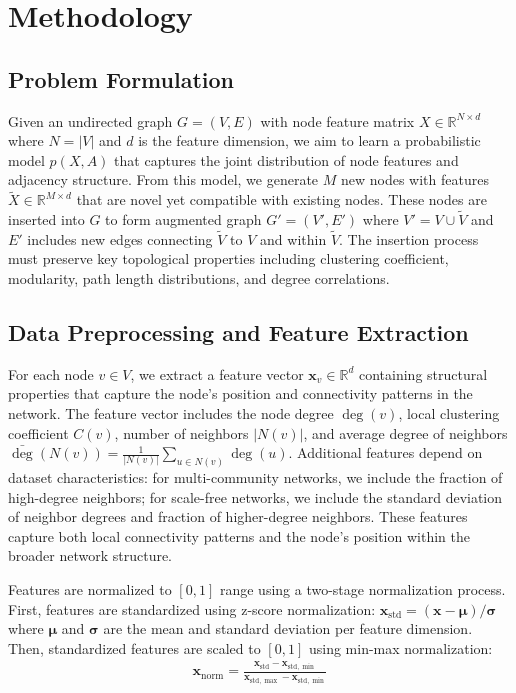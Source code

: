 \documentclass[12pt]{article}
\begin{document}
\section{Methodology}

\subsection{Problem Formulation}

Given an undirected graph $G = (V, E)$ with node feature matrix $X \in \mathbb{R}^{N \times d}$ where $N = |V|$ and $d$ is the feature dimension, we aim to learn a probabilistic model $p(X, A)$ that captures the joint distribution of node features and adjacency structure. From this model, we generate $M$ new nodes with features $\tilde{X} \in \mathbb{R}^{M \times d}$ that are novel yet compatible with existing nodes. These nodes are inserted into $G$ to form augmented graph $G' = (V', E')$ where $V' = V \cup \tilde{V}$ and $E'$ includes new edges connecting $\tilde{V}$ to $V$ and within $\tilde{V}$. The insertion process must preserve key topological properties including clustering coefficient, modularity, path length distributions, and degree correlations.

\subsection{Data Preprocessing and Feature Extraction}

For each node $v \in V$, we extract a feature vector $\mathbf{x}_v \in \mathbb{R}^d$ containing structural properties that capture the node's position and connectivity patterns in the network. The feature vector includes the node degree $\deg(v)$, local clustering coefficient $C(v)$, number of neighbors $|N(v)|$, and average degree of neighbors $\bar{\deg}(N(v)) = \frac{1}{|N(v)|} \sum_{u \in N(v)} \deg(u)$. Additional features depend on dataset characteristics: for multi-community networks, we include the fraction of high-degree neighbors; for scale-free networks, we include the standard deviation of neighbor degrees and fraction of higher-degree neighbors. These features capture both local connectivity patterns and the node's position within the broader network structure.

Features are normalized to $[0,1]$ range using a two-stage normalization process. First, features are standardized using z-score normalization: $\mathbf{x}_{\text{std}} = (\mathbf{x} - \boldsymbol{\mu}) / \boldsymbol{\sigma}$ where $\boldsymbol{\mu}$ and $\boldsymbol{\sigma}$ are the mean and standard deviation per feature dimension. Then, standardized features are scaled to $[0,1]$ using min-max normalization:
\begin{align}
\mathbf{x}_{\text{norm}} = \frac{\mathbf{x}_{\text{std}} - \mathbf{x}_{\text{std},\min}}{\mathbf{x}_{\text{std},\max} - \mathbf{x}_{\text{std},\min}}
\end{align}
\end{document}
